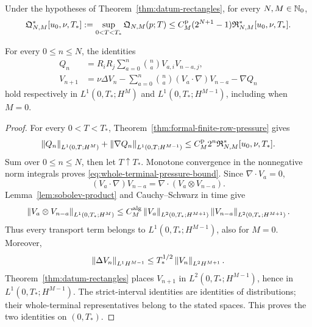 \begin{proposition}
\label{prop:rectangle-pressure-completion}
Under the hypotheses of Theorem~\ref{thm:datum-rectangles}, for every
\(N,M\in\mathbb N_0\),
\begin{equation}
 \mathfrak Q_{N,M}^*[u_0,\nu,T_*]
 :=\sup_{0<T<T_*}\mathfrak Q_{N,M}(p;T)
 \le
 C_M^{\rm p}(2^{N+1}-1)\mathfrak R_{N,M}^*[u_0,\nu,T_*].
 \label{eq:whole-terminal-pressure-bound}
\end{equation}
\begin{samepage}
For every \(0\le n\le N\), the identities
\begin{align}
 Q_n
 &=R_iR_j\sum_{a=0}^n\binom naV_{a,i}V_{n-a,j},
 \label{eq:rectangle-pressure-identity}\\
 V_{n+1}
 &=\nu\Delta V_n
 -\sum_{a=0}^n\binom na(V_a\cdot\nabla)V_{n-a}-\nabla Q_n
 \label{eq:rectangle-velocity-identity}
\end{align}
hold respectively in
\(L^1(0,T_*;H^M)\) and \(L^1(0,T_*;H^{M-1})\), including when
\(M=0\).
\end{samepage}
\end{proposition}

\begin{proof}
For every \(0<T<T_*\),
Theorem~\ref{thm:formal-finite-row-pressure} gives
\[
 \left\lVert Q_n\right\rVert_{L^1(0,T;H^M)}
 +\left\lVert \nabla Q_n\right\rVert_{L^1(0,T;H^{M-1})}
 \le C_M^{\rm p}2^n\mathfrak R_{N,M}^*[u_0,\nu,T_*].
\]
Sum over \(0\le n\le N\), then let \(T\uparrow T_*\).  Monotone
convergence in the nonnegative norm integrals proves
\eqref{eq:whole-terminal-pressure-bound}.  Since
\(\nabla\cdot V_a=0\),
\[
 (V_a\cdot\nabla)V_{n-a}
 =\nabla\cdot(V_a\otimes V_{n-a}).
\]
Lemma~\ref{lem:sobolev-product} and Cauchy--Schwarz in time give
\[
 \left\lVert V_a\otimes V_{n-a}\right\rVert_{L^1(0,T_*;H^M)}
 \le C_M^{\rm alg}
 \left\lVert V_a\right\rVert_{L^2(0,T_*;H^{M+1})}
 \left\lVert V_{n-a}\right\rVert_{L^2(0,T_*;H^{M+1})}.
\]
Thus every transport term belongs to
\(L^1(0,T_*;H^{M-1})\), also for \(M=0\).  Moreover,
\[
 \left\lVert \Delta V_n\right\rVert_{L^1H^{M-1}}
 \le T_*^{1/2}\left\lVert V_n\right\rVert_{L^2H^{M+1}}.
\]
Theorem~\ref{thm:datum-rectangles} places \(V_{n+1}\) in
\(L^2(0,T_*;H^{M-1})\), hence in \(L^1(0,T_*;H^{M-1})\).
The strict-interval identities are identities of distributions; their
whole-terminal representatives belong to the stated spaces.  This proves the
two identities on \((0,T_*)\).
\end{proof}

